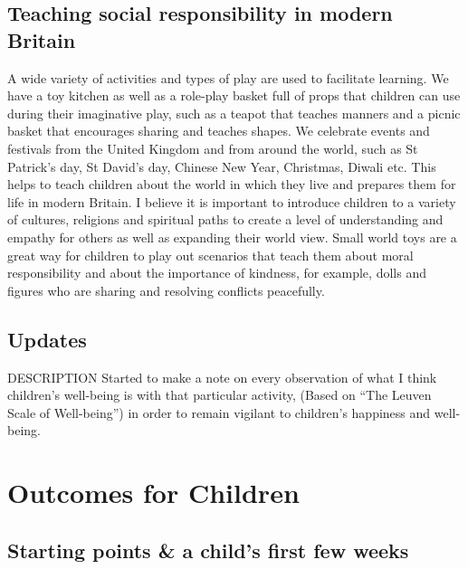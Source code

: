 \documentclass[10pt,a4paper]{report}
\makeatletter
\newcommand{\DESCRIPTION@original@item}{}
\let\DESCRIPTION@original@item\item
\newcommand*{\DESCRIPTION@envir}{DESCRIPTION}
\newlength{\DESCRIPTION@totalleftmargin}
\newlength{\DESCRIPTION@linewidth}
\newcommand{\DESCRIPTION@makelabel}[1]{\llap{#1}}%
\newcommand{\DESCRIPTION@item}[1][]{%
  \setlength{\@totalleftmargin}%
       {\DESCRIPTION@totalleftmargin+\widthof{\textbf{#1 }}-\leftmargin}%
  \setlength{\linewidth}
       {\DESCRIPTION@linewidth-\widthof{\textbf{#1 }}+\leftmargin}%
  \par\parshape \@ne \@totalleftmargin \linewidth
  \DESCRIPTION@original@item[\textbf{#1}]%
}
\newenvironment{DESCRIPTION}
  {\list{}{\setlength{\labelwidth}{0cm}%
           \let\makelabel\DESCRIPTION@makelabel}%
   \setlength{\DESCRIPTION@totalleftmargin}{\@totalleftmargin}%
   \setlength{\DESCRIPTION@linewidth}{\linewidth}%
   \renewcommand{\item}{\ifx\@currenvir\DESCRIPTION@envir
                           \expandafter\DESCRIPTION@item
                        \else
                           \expandafter\DESCRIPTION@original@item
                        \fi}}
  {\endlist}
\makeatother
\begin{document}
\section{Teaching social responsibility in modern Britain}

A wide variety of activities and types of play are used to facilitate learning. We have a toy kitchen as well as a role-play basket full of props that children can use during their imaginative play, such as a teapot that teaches manners and a picnic basket that encourages sharing and teaches shapes. We celebrate events and festivals from the United Kingdom and from around the world, such as St Patrick's day, St David's day, Chinese New Year, Christmas, Diwali etc. This helps to teach children about the world in which they live and prepares them for life in modern Britain. I believe it is important to introduce children to a variety of cultures, religions and spiritual paths to create a level of understanding and empathy for others as well as expanding their world view. Small world toys are a great way for children to play out scenarios that teach them about moral responsibility and about the importance of kindness, for example, dolls and figures who are sharing and resolving conflicts peacefully.

\section{Updates}

\begin{DESCRIPTION}
\item [June 2016] Started to make a note on every observation of what I think children's well-being is with that particular activity, (Based on “The Leuven Scale of Well-being”) in order to remain vigilant to children's happiness and well-being.
\end{DESCRIPTION}

\chapter{Outcomes for Children}

\section{Starting points \& a child's first few weeks}
\end{document}

